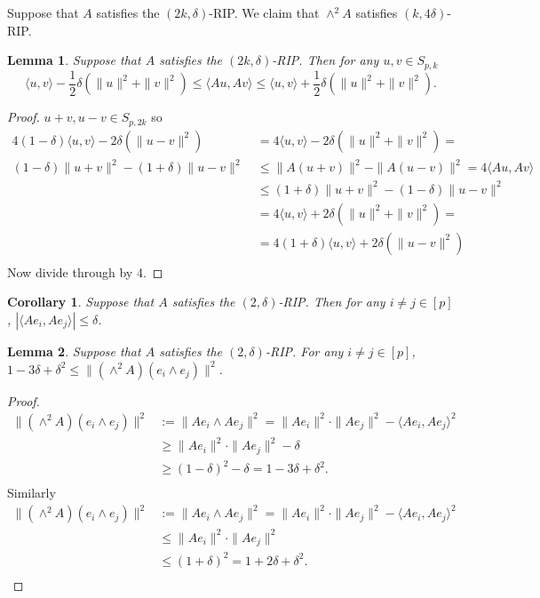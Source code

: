 \documentclass[11pt]{amsart}
\newtheorem{lemma}{Lemma}
\newtheorem{corollary}{Corollary}
\begin{document}
Suppose that $A$ satisfies the $(2k, \delta)$-RIP.  We claim that $\wedge^2 A$ satisfies $(k, 4\delta)$-RIP.   



\begin{lemma}
Suppose that $A$ satisfies the $(2k, \delta)$-RIP.  Then for any $u,v\in S_{p,k}$  
\begin{equation}
\langle u, v \rangle-\frac{1}{2} \delta (\|u\|^2 + \|v\|^2) \leq \langle Au,Av \rangle\leq \langle u, v \rangle+\frac{1}{2} \delta (\|u\|^2 + \|v\|^2).
\end{equation}
\end{lemma}
\begin{proof}
$u+v, u-v \in S_{p,2k}$ so 
\begin{align*}
4(1-\delta) \langle u, v \rangle-2 \delta (\|u-v\|^2)&=4 \langle u, v \rangle-2 \delta (\|u\|^2 + \|v\|^2) = \\
(1-\delta) \|u+v\|^2- (1+\delta) \|u-v\|^2 \ &\leq \|A(u+v)\|^2- \|A(u-v)\|^2 =4 \langle Au, Av\rangle  \\
&\leq  (1+\delta) \|u+v\|^2- (1-\delta) \|u-v\|^2 \\
&=4 \langle u, v \rangle+2 \delta (\|u\|^2 + \|v\|^2)=\\
&=4(1+\delta) \langle u, v \rangle+2 \delta (\|u-v\|^2)\\ 
\end{align*}
Now divide through by 4.
\end{proof}
\begin{corollary}
Suppose that $A$ satisfies the $(2, \delta)$-RIP.  Then for any $i\neq j\in [p]$, $|\langle Ae_i, Ae_j\rangle|\leq \delta$.
\end{corollary}
\begin{lemma}
 Suppose that $A$ satisfies the $(2, \delta)$-RIP.
 For any $i\neq j\in [p]$, $1-3\delta+\delta^2\leq \| (\wedge^2 A)(e_i\wedge e_j)\|^2$.
\end{lemma}
\begin{proof}
\begin{align*}
  \| (\wedge^2 A)(e_i\wedge e_j)\|^2&:= \| Ae_i\wedge Ae_j\|^2=\|Ae_i\|^2\cdot \|Ae_j\|^2-\langle Ae_i, Ae_j\rangle ^2 \\
 &\geq  \|Ae_i\|^2\cdot \|Ae_j\|^2-\delta\\
 &\geq  (1-\delta)^2-\delta=1-3\delta +\delta^2.\\
\end{align*}
Similarly
\begin{align*}
  \| (\wedge^2 A)(e_i\wedge e_j)\|^2&:= \| Ae_i\wedge Ae_j\|^2=\|Ae_i\|^2\cdot \|Ae_j\|^2-\langle Ae_i, Ae_j\rangle ^2 \\
 &\leq  \|Ae_i\|^2\cdot \|Ae_j\|^2\\
 &\leq  (1+\delta)^2=1+2\delta +\delta^2.\\
\end{align*}
\end{proof}
\end{document}

